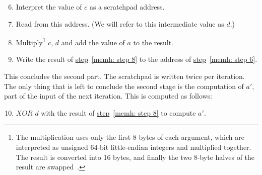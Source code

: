 \begin{enumerate}
  \setcounter{enumi}{5}
  \item \label{memh: step 6} Interpret the value of $c$ as a scratchpad address.
  \item Read from this address. (We will refer to this intermediate value as $d$.)
  \item \label{memh: step 8} Multiply\footnote{The multiplication uses only the first 8 bytes of each argument, which are interpreted as unsigned 64-bit little-endian integers and multiplied together. The result is converted into 16 bytes, and finally the two 8-byte halves of the result are swapped~\cite{cryptonight}.} $c$, $d$ and add the value of $a$ to the result.
  \item Write the result of \hyperref[memh: step 8]{step}~\ref{memh: step 8} to the address of \hyperref[memh: step 6]{step}~\ref{memh: step 6}.
\end{enumerate}
This concludes the second part. The scratchpad is written twice per iteration. The only thing that is left to conclude the second stage is the computation of $a'$, part of the input of the next iteration. This is computed as follows:

\begin{enumerate}
  \setcounter{enumi}{9}
  \item $XOR$ $d$ with the result of \hyperref[memh: step 8]{step}~\ref{memh: step 8} to compute $a'$.
\end{enumerate}



%
%
%
%
%
